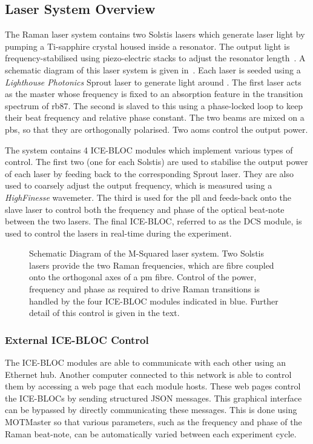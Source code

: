 \subsection{Laser System Overview}
\label{subsec:msquared_overview} The Raman laser system contains two Solstis lasers which
generate laser light by pumping a Ti-sapphire crystal housed inside a resonator.
The output light is frequency-stabilised using piezo-electric stacks to adjust
the resonator length~\cite{Drever1983}. A schematic diagram of this laser system is given
in~. Each laser is seeded using a
\textit{Lighthouse Photonics} Sprout laser to generate light around
. The first laser acts as the master whose frequency
is fixed to an absorption feature in the transition spectrum of
\ac{rb87}. The second is slaved to this using a phase-locked loop to keep their
beat frequency and relative phase constant. The two beams are mixed on a
\ac{pbs}, so that they are orthogonally polarised. Two \acp{aom} control the
output power. 
\par\noindent 
The system contains 4 ICE-BLOC modules which implement various types of control. The
first two (one for each Solstis) are used to stabilise the output power of each
laser by feeding back to the corresponding Sprout laser. They are also used to
coarsely adjust the output frequency, which is measured using a
\textit{HighFinesse} wavemeter. The third is used for the \ac{pll}
and feeds-back onto the slave laser to control both the frequency and phase of
the optical beat-note between the two lasers. The final ICE-BLOC, referred to
as the DCS module, is used to control the lasers in real-time during the
experiment.  
\begin{figure}
	\centering \fontsize{12pt}{11pt}
	\resizebox{0.5\textwidth}{!}{}
	\caption[M-Squared Laser System Schematic]{Schematic Diagram of the M-Squared
		laser system. Two Solstis lasers provide the two Raman frequencies, which
		are fibre coupled onto the orthogonal axes of a \ac{pm} fibre. Control of
		the power, frequency and phase as required to drive Raman transitions is
		handled by the four ICE-BLOC modules indicated in blue. Further detail of
		this control is given in the text.} \label{fig:msquared_laser}
\end{figure}

\subsubsection{External ICE-BLOC Control}
The ICE-BLOC modules are able to communicate with each other using an Ethernet
hub. Another computer connected to this network is able to control them by
accessing a web page that each module hosts. These web pages control the ICE-BLOCs
by sending structured JSON messages. This graphical interface can be bypassed by
directly communicating these messages. This is done using MOTMaster so that
various parameters, such as the frequency and phase of the Raman beat-note, can
be automatically varied between each experiment cycle. 
